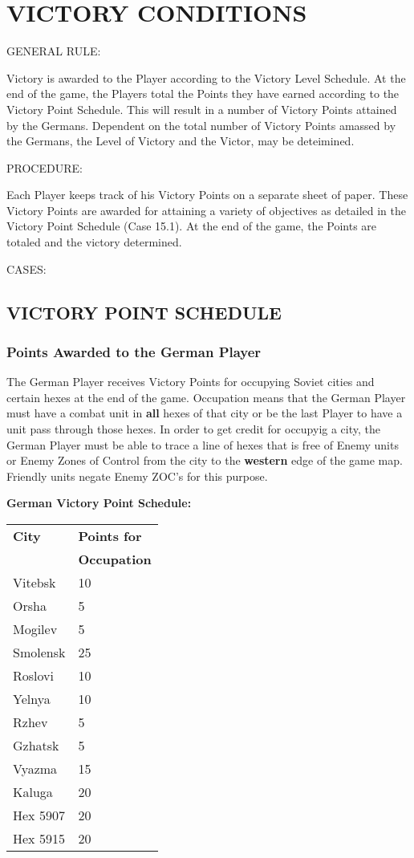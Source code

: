 \section{VICTORY CONDITIONS}

GENERAL RULE:

Victory is awarded to the Player according to the Victory Level Schedule. At the end of the game, the Players total the Points they have earned according to the Victory Point Schedule. This will result in a number of Victory Points attained by the Germans. Dependent on the total number of Victory Points amassed by the Germans, the Level of Victory and the Victor, may be deteimined.

PROCEDURE:

Each Player keeps track of his Victory Points on a separate sheet of paper. These Victory Points are awarded for attaining a variety of objectives as detailed in the Victory Point Schedule (Case 15.1). At the end of the game, the Points are totaled and the victory determined.

CASES:

\subsection{VICTORY POINT SCHEDULE}

\subsubsection{Points Awarded to the German Player}

The German Player receives Victory Points for occupying Soviet cities and certain hexes at the end of the game. Occupation means that the German Player must have a combat unit in \textbf{all} hexes of that city or be the last Player to have a unit pass through those hexes. In order to get credit for occupyig a city, the German Player must be able to trace a line of hexes that is free of Enemy units or Enemy Zones of Control from the city to the \textbf{western} edge of the game map. Friendly units negate Enemy ZOC's for this purpose.

\textbf{German Victory Point Schedule:}

\begin{tabular}{ll}
  \textbf{City} & \textbf{Points for}\\
  & \textbf{Occupation}\\
  Vitebsk & 10\\
  Orsha & 5\\
  Mogilev & 5\\
  Smolensk & 25\\
  Roslovi & 10\\
  Yelnya & 10\\
  Rzhev & 5\\
  Gzhatsk & 5\\
  Vyazma & 15\\
  Kaluga & 20\\
  Hex 5907 & 20\\
  Hex 5915 & 20
\end{tabular}

